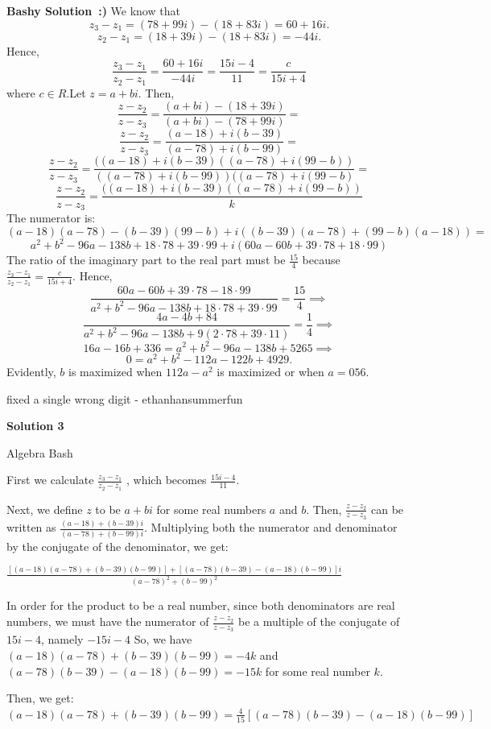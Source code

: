 \begin{enumerate}
 \textbf{Bashy Solution :)} We know that
 \[z_3-z_1 = (78+99i)-(18+83i) = 60 + 16i.\]
 \[z_2-z_1=(18+39i)-(18+83i) = -44i.\]Hence,
 \[\frac{z_3-z_1}{z_2-z_1} = \frac{60 + 16i}{-44i} = \frac{15i-4}{11} = \frac{c}{15i+4}\]where $c \in R$.Let $z = a+bi$. Then,
 \[\frac{z-z_2}{z-z_3} = \frac{(a+bi)-(18+39i)}{(a+bi)-(78+99i)} =\]
 \[\frac{z-z_2}{z-z_3} = \frac{(a-18)+i(b-39)}{(a-78)+i(b-99)} =\]
 \[\frac{z-z_2}{z-z_3} = \frac{((a-18)+i(b-39)((a-78)+i(99-b))}{((a-78)+i(b-99))((a-78)+i(99-b)} =\]
 \[\frac{z-z_2}{z-z_3} = \frac{((a-18)+i(b-39)((a-78)+i(99-b))}{k}\]The numerator is:
 \[(a-18)(a-78)-(b-39)(99-b)+i((b-39)(a-78) + (99-b)(a-18))=\]
 \[a^2+b^2-96a-138b+18 \cdot 78 + 39 \cdot 99 + i(60a - 60b + 39 \cdot 78 + 18 \cdot 99)\]The ratio of the imaginary part to the real part must be $\frac{15}{4}$ because $\frac{z_3-z_1}{z_2-z_1} = \frac{c}{15i+4}.$ Hence,
 \[\frac{60a - 60b + 39 \cdot 78 - 18 \cdot 99}{a^2+b^2-96a-138b+18 \cdot 78 + 39 \cdot 99} = \frac{15}{4} \implies\]
 \[\frac{4a-4b+84}{a^2+b^2-96a-138b+9(2 \cdot 78 + 39 \cdot 11)} = \frac{1}{4} \implies\]
 \[16a - 16b + 336 = a^2 + b^2 -96a - 138b +5265 \implies\]
 \[0 = a^2 + b^2 -112a-122b+4929.\]Evidently, $b$ is maximized when $112a-a^2$ is maximized or when $a = \boxed{056}.$

 fixed a single wrong digit - ethanhansummerfun

 



\textbf{Solution 3}

Algebra Bash

 First we calculate $\frac{z_3 - z_1}{z_2 - z_1}$ , which becomes $\frac{15i-4}{11}$.

 Next, we define $z$ to be $a+bi$ for some real numbers $a$ and $b$. Then, $\frac {z-z_2}{z-z_3}$ can be written as $\frac{(a-18)+(b-39)i}{(a-78)+(b-99)i}.$ Multiplying both the numerator and denominator by the conjugate of the denominator, we get:

 $\frac {[(a-18)(a-78)+(b-39)(b-99)]+[(a-78)(b-39)-(a-18)(b-99)]i}{(a-78)^2+(b-99)^2}$

 In order for the product to be a real number, since both denominators are real numbers, we must have the numerator of $\frac {z-z_2}{z-z_3}$ be a multiple of the conjugate of $15i-4$, namely $-15i-4$ So, we have $(a-18)(a-78)+(b-39)(b-99) = -4k$ and $(a-78)(b-39)-(a-18)(b-99) = -15k$ for some real number $k$.

 Then, we get:$(a-18)(a-78)+(b-39)(b-99) = \frac{4}{15}[(a-78)(b-39)-(a-18)(b-99)]$


\end{enumerate}
